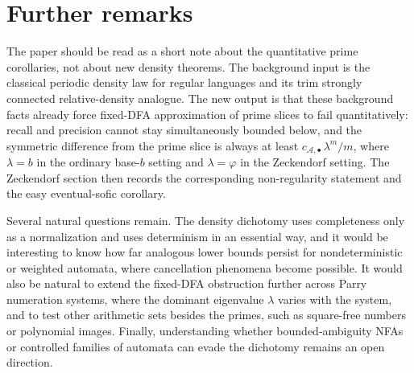 \section{Further remarks}\label{sec:conclusion}

The paper should be read as a short note about the quantitative prime
corollaries, not about new density theorems. The background input is
the classical periodic density law for regular languages and its trim
strongly connected relative-density analogue. The new output is that
these background facts already force fixed-DFA approximation of prime
slices to fail quantitatively: recall and precision cannot stay
simultaneously bounded below, and the symmetric difference from the
prime slice is always at least
\(c_{\mathcal A,\bullet}\,\lambda^m/m\), where \(\lambda=b\) in the
ordinary base-\(b\) setting and \(\lambda=\varphi\) in the Zeckendorf
setting. The Zeckendorf section then records the corresponding
non-regularity statement and the easy eventual-sofic corollary.

Several natural questions remain. The density dichotomy uses completeness
only as a normalization and uses determinism in an essential way, and
it would be interesting to know how far analogous lower bounds persist
for nondeterministic or weighted automata, where cancellation phenomena
become possible. It would also be natural to extend the fixed-DFA
obstruction further across Parry numeration systems, where the dominant
eigenvalue \(\lambda\) varies with the system, and to test other
arithmetic sets besides the primes, such as square-free numbers or
polynomial images. Finally, understanding whether bounded-ambiguity NFAs
or controlled families of automata can evade the dichotomy remains an
open direction.
